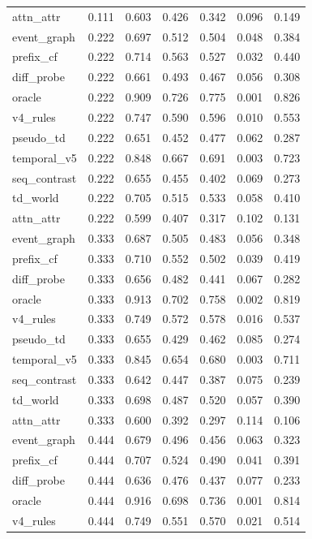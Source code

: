 \documentclass{article}
\begin{document}
\begin{longtable}{@{}lrrrrrr@{}}
attn\_attr & 0.111 & 0.603 & 0.426 & 0.342 & 0.096 & 0.149 \\
event\_graph & 0.222 & 0.697 & 0.512 & 0.504 & 0.048 & 0.384 \\
prefix\_cf & 0.222 & 0.714 & 0.563 & 0.527 & 0.032 & 0.440 \\
diff\_probe & 0.222 & 0.661 & 0.493 & 0.467 & 0.056 & 0.308 \\
oracle & 0.222 & 0.909 & 0.726 & 0.775 & 0.001 & 0.826 \\
v4\_rules & 0.222 & 0.747 & 0.590 & 0.596 & 0.010 & 0.553 \\
pseudo\_td & 0.222 & 0.651 & 0.452 & 0.477 & 0.062 & 0.287 \\
temporal\_v5 & 0.222 & 0.848 & 0.667 & 0.691 & 0.003 & 0.723 \\
seq\_contrast & 0.222 & 0.655 & 0.455 & 0.402 & 0.069 & 0.273 \\
td\_world & 0.222 & 0.705 & 0.515 & 0.533 & 0.058 & 0.410 \\
attn\_attr & 0.222 & 0.599 & 0.407 & 0.317 & 0.102 & 0.131 \\
event\_graph & 0.333 & 0.687 & 0.505 & 0.483 & 0.056 & 0.348 \\
prefix\_cf & 0.333 & 0.710 & 0.552 & 0.502 & 0.039 & 0.419 \\
diff\_probe & 0.333 & 0.656 & 0.482 & 0.441 & 0.067 & 0.282 \\
oracle & 0.333 & 0.913 & 0.702 & 0.758 & 0.002 & 0.819 \\
v4\_rules & 0.333 & 0.749 & 0.572 & 0.578 & 0.016 & 0.537 \\
pseudo\_td & 0.333 & 0.655 & 0.429 & 0.462 & 0.085 & 0.274 \\
temporal\_v5 & 0.333 & 0.845 & 0.654 & 0.680 & 0.003 & 0.711 \\
seq\_contrast & 0.333 & 0.642 & 0.447 & 0.387 & 0.075 & 0.239 \\
td\_world & 0.333 & 0.698 & 0.487 & 0.520 & 0.057 & 0.390 \\
attn\_attr & 0.333 & 0.600 & 0.392 & 0.297 & 0.114 & 0.106 \\
event\_graph & 0.444 & 0.679 & 0.496 & 0.456 & 0.063 & 0.323 \\
prefix\_cf & 0.444 & 0.707 & 0.524 & 0.490 & 0.041 & 0.391 \\
diff\_probe & 0.444 & 0.636 & 0.476 & 0.437 & 0.077 & 0.233 \\
oracle & 0.444 & 0.916 & 0.698 & 0.736 & 0.001 & 0.814 \\
v4\_rules & 0.444 & 0.749 & 0.551 & 0.570 & 0.021 & 0.514 \\

\end{longtable}
\end{document}
